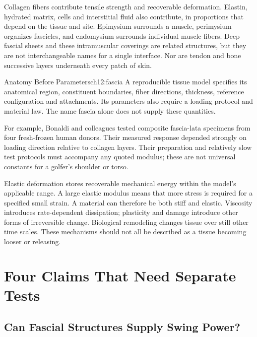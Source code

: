 Collagen fibers contribute tensile strength and recoverable deformation. Elastin, hydrated matrix, cells and interstitial fluid also contribute, in proportions that depend on the tissue and site. Epimysium surrounds a muscle, perimysium organizes fascicles, and endomysium surrounds individual muscle fibers. Deep fascial sheets and these intramuscular coverings are related structures, but they are not interchangeable names for a single interface. Nor are tendon and bone successive layers underneath every patch of skin.

\begin{definition}{Anatomy Before Parameters}{ch12:fascia}
A reproducible tissue model specifies its anatomical region, constituent boundaries, fiber directions, thickness, reference configuration and attachments. Its parameters also require a loading protocol and material law. The name fascia alone does not supply these quantities.
\end{definition}

For example, Bonaldi and colleagues tested composite fascia-lata specimens from four fresh-frozen human donors. Their measured response depended strongly on loading direction relative to collagen layers. Their preparation and relatively slow test protocols must accompany any quoted modulus; these are not universal constants for a golfer's shoulder or torso. \citep{glossaryFascia2023}

Elastic deformation stores recoverable mechanical energy within the model's applicable range. A large elastic modulus means that more stress is required for a specified small strain. A material can therefore be both stiff and elastic. Viscosity introduces rate-dependent dissipation; plasticity and damage introduce other forms of irreversible change. Biological remodeling changes tissue over still other time scales. These mechanisms should not all be described as a tissue becoming looser or releasing.

\section{Four Claims That Need Separate Tests}

\subsection{Can Fascial Structures Supply Swing Power?}

